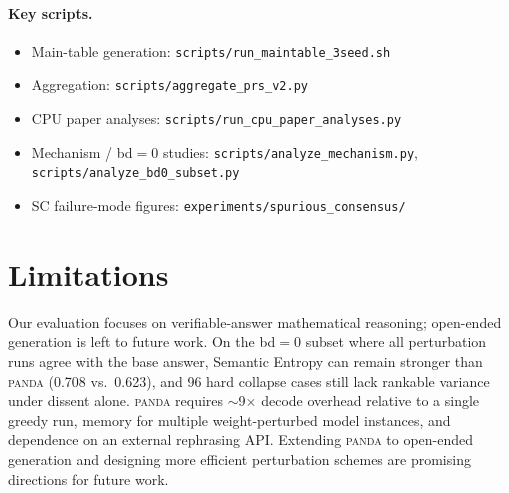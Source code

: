 \documentclass{article} %
\DeclareRobustCommand{\method}{%
  \texorpdfstring{%
    \ifmmode\text{\normalfont\textsc{panda}}\else\textsc{panda}\xspace\fi
  }{PANDA}%
}
\begin{document}
\paragraph{Key scripts.}
\begin{itemize}[leftmargin=*, itemsep=2pt]
  \item Main-table generation: \texttt{scripts/run\_maintable\_3seed.sh}
  \item Aggregation: \texttt{scripts/aggregate\_prs\_v2.py}
  \item CPU paper analyses: \texttt{scripts/run\_cpu\_paper\_analyses.py}
  \item Mechanism / bd$=0$ studies: \texttt{scripts/analyze\_mechanism.py}, \texttt{scripts/analyze\_bd0\_subset.py}
  \item SC failure-mode figures: \texttt{experiments/spurious\_consensus/}
\end{itemize}


\section{Limitations}
\label{app:limitations}

Our evaluation focuses on verifiable-answer mathematical reasoning; open-ended generation is left to future work.
On the bd$=0$ subset where all perturbation runs agree with the base answer, Semantic Entropy can remain stronger than \method{} (0.708 vs.\ 0.623), and 96 hard collapse cases still lack rankable variance under dissent alone.
\method{} requires $\sim$9$\times$ decode overhead relative to a single greedy run, memory for multiple weight-perturbed model instances, and dependence on an external rephrasing API.
Extending \method{} to open-ended generation and designing more efficient perturbation schemes are promising directions for future work.
\end{document}
